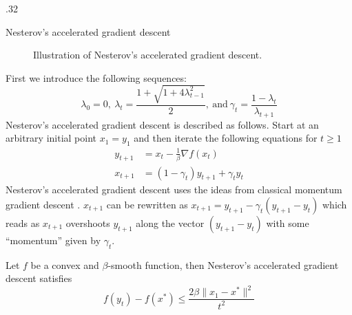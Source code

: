 \documentclass[final,t]{beamer}
\newcommand{\norm}[2][]{#1\lVert #2 #1\rVert}
\begin{document}
\begin{frame}[containsverbatim]
\begin{columns}[t]
\begin{column}{.32\linewidth}
\begin{exampleblock}{Nesterov's accelerated gradient descent}
    \begin{figure}
      \begin{center}
        \end{center}
      \caption{Illustration of Nesterov's accelerated gradient descent.}
      \label{fig:nesterovacc}
    \end{figure}
    First we introduce the following sequences:
    \begin{equation*}
      \lambda_0 = 0, \ \lambda_t = \frac{1 + \sqrt{1 + 4\lambda_{t-1}^2}}{2}, \ \text{and} \ \gamma_t = \frac{1 - \lambda_t}{\lambda_{t + 1}}
    \end{equation*}
    Nesterov's accelerated gradient descent is described as follows. Start at an arbitrary initial point $x_1=y_1$ and then iterate
    the following equations for $t\geq1$
    \begin{align}
    y_{t+1} &= x_t - \frac{1}{\beta}\nabla f(x_t) \label{nesterov:y}\\
    x_{t+1} &= (1 - \gamma_t)y_{t+1} + \gamma_t y_t \label{nesterov:x}
    \end{align}
    Nesterov's accelerated gradient descent uses the ideas from classical momentum gradient descent \parencite{sutskever}.
    $x_{t+1}$ can be rewritten as $x_{t+1} = y_{t+1} - \gamma_t(y_{t+1} - y_{t})$ which reads as $x_{t+1}$ overshoots $y_{t+1}$ along the vector
    $(y_{t+1} - y_{t})$ with some ``momentum'' given by $\gamma_t$.
    \begin{theorem}[{\bf 3}]\label{thm:3.19}
    Let $f$ be a convex and $\beta$-smooth function, then Nesterov's accelerated gradient descent satisfies
    \newline \\
    \begin{equation*}
      f(y_t) - f(x^*) \leq \frac{2\beta\norm{x_1 - x^*}^2}{t^2}
    \end{equation*}
    \end{theorem}


\end{exampleblock}
\end{column}
\end{columns}
\end{frame}
\end{document}
